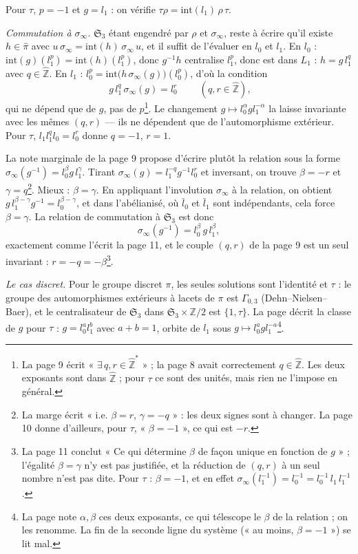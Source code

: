 \documentclass[11pt,a4paper]{article}
\begin{document}
Pour $\tau$, $p = -1$ et $g = l_1$ : on vérifie $\tau\rho = \mathrm{int}(l_1)\,
\rho\,\tau$.

\emph{Commutation à $\sigma_\infty$.} $\mathfrak{S}_3$ étant engendré par $\rho$
et $\sigma_\infty$, reste à écrire qu'il existe $h \in \widehat{\pi}$ avec
$u\,\sigma_\infty = \mathrm{int}(h)\,\sigma_\infty\, u$, et il suffit de
l'évaluer en $l_0$ et $l_1$. En $l_0$ : $\mathrm{int}(g)(l_1^{p}) =
\mathrm{int}(h)(l_1^{p})$, donc $g^{-1}h$ centralise $l_1^{p}$, donc est dans
$L_1$ : $h = g\, l_1^{q}$ avec $q \in \widehat{\mathbb{Z}}$. En $l_1$ :
$l_0^{p} = \mathrm{int}\bigl(h\,\sigma_\infty(g)\bigr)(l_0^{p})$, d'où la
condition
\[
\boxed{\; g\, l_1^{q}\, \sigma_\infty(g) = l_0^{r} \;} \qquad (q, r \in
\widehat{\mathbb{Z}}),
\]
qui ne dépend que de $g$, pas de $p$\footnote{La page 9 écrit « $\exists\, q, r
\in \hat{\mathbb{Z}}^{*}$ » ; la page 8 avait correctement $q \in
\hat{\mathbb{Z}}$. Les deux exposants sont dans $\widehat{\mathbb{Z}}$ ; pour
$\tau$ ce sont des unités, mais rien ne l'impose en général.}. Le changement
$g \mapsto l_0^{\alpha} g l_1^{-\alpha}$ la laisse invariante avec les mêmes
$(q, r)$ — ils ne dépendent que de l'automorphisme extérieur. Pour $\tau$, $l_1
l_1^{q} l_0 = l_0^{r}$ donne $q = -1$, $r = 1$.

La note marginale de la page 9 propose d'écrire plutôt la relation sous la
forme $\sigma_\infty(g^{-1}) = l_0^{\beta} g\, l_1^{\gamma}$. Tirant
$\sigma_\infty(g) = l_1^{-q} g^{-1} l_0^{r}$ et inversant, on trouve $\beta =
-r$ et $\gamma = q$\footnote{La marge écrit « i.e. $\beta = r$, $\gamma = -q$ » :
les deux signes sont à changer. La page 10 donne d'ailleurs, pour $\tau$,
« $\beta = -1$ », ce qui est $-r$.}. Mieux : $\beta = \gamma$. En appliquant
l'involution $\sigma_\infty$ à la relation, on obtient $g\, l_1^{\beta-\gamma}
g^{-1} = l_0^{\beta-\gamma}$, et dans l'abélianisé, où $\bar l_0$ et $\bar l_1$
sont indépendants, cela force $\beta = \gamma$. La relation de commutation à
$\mathfrak{S}_3$ est donc
\[
\sigma_\infty(g^{-1}) = l_0^{\beta}\, g\, l_1^{\beta},
\]
exactement comme l'écrit la page 11, et le couple $(q, r)$ de la page 9 est
un seul invariant : $r = -q = -\beta$\footnote{La page 11 conclut « Ce qui
détermine $\beta$ de façon unique en fonction de $g$ » ; l'égalité $\beta =
\gamma$ n'y est pas justifiée, et la réduction de $(q, r)$ à un seul nombre
n'est pas dite. Pour $\tau$ : $\beta = -1$, et en effet $\sigma_\infty(l_1^{-1})
= l_0^{-1} = l_0^{-1}\, l_1\, l_1^{-1}$.}.

\emph{Le cas discret.} Pour le groupe discret $\pi$, les seules solutions sont
l'identité et $\tau$ : le groupe des automorphismes extérieurs à lacets de
$\pi$ est $\Gamma_{0,3}$ (Dehn--Nielsen--Baer), et le centralisateur de
$\mathfrak{S}_3$ dans $\mathfrak{S}_3 \times \mathbb{Z}/2$ est $\{1, \tau\}$.
La page décrit la classe de $g$ pour $\tau$ : $g = l_0^{a} l_1^{b}$ avec $a + b
= 1$, orbite de $l_1$ sous $g \mapsto l_0^{a} g l_1^{-a}$\footnote{La page note
$\alpha, \beta$ ces deux exposants, ce qui télescope le $\beta$ de la
relation ; on les renomme. La fin de la seconde ligne du système (« au moins,
$\beta = -1$ ») se lit mal.}.
\end{document}
